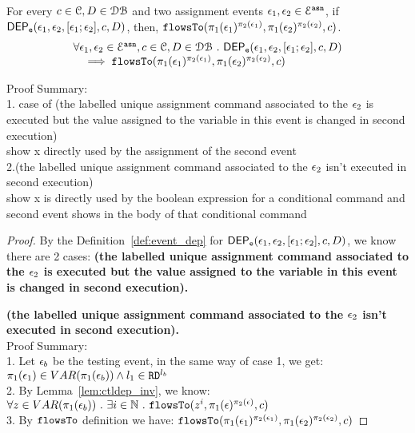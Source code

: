 \begin{lem}
	\label{lem:flowsto_soundness_emptytrace}
	For every $ c \in \mathcal{C}, D \in \mathcal{DB}$ and two assignment events $\mathtt{\epsilon}_1, \mathtt{\epsilon}_2 \in \mathcal{E}^{\mathtt{{asn}}}$,
	if $\mathsf{DEP_{\mathtt{e}}}(\mathtt{\epsilon}_1, \mathtt{\epsilon}_2, [\mathtt{\epsilon}_1; \mathtt{\epsilon}_2],  c, D) $,
	then, $\mathtt{flowsTo}(\pi_1(\mathtt{\epsilon}_1)^{\pi_2(\mathtt{\epsilon}_1)}, \pi_1(\mathtt{\epsilon}_2)^{\pi_2(\mathtt{\epsilon}_2)}, c)$.
	\[
	\begin{array}{l}
		\forall \mathtt{\epsilon}_1, \mathtt{\epsilon}_2 \in \mathcal{E}^{\mathtt{{asn}}}, c \in \mathcal{C}, D \in \mathcal{DB} 
		~.~ 
		\mathsf{DEP_{\mathtt{e}}}(\mathtt{\epsilon}_1, \mathtt{\epsilon}_2, [\mathtt{\epsilon}_1; \mathtt{\epsilon}_2],  c, D) 
		\\ \quad 
		\implies 
		\mathtt{flowsTo}(\pi_1(\mathtt{\epsilon}_1)^{\pi_2(\mathtt{\epsilon}_1)}, \pi_1(\mathtt{\epsilon}_2)^{\pi_2(\mathtt{\epsilon}_2)}, c)
	\end{array}
	\]
\end{lem}
Proof Summary:
\\
1. case of (the labelled unique assignment command associated to the $\mathtt{\epsilon}_2$ 
is executed but the value assigned to the variable in this event is changed in second execution)
\\
show x directly used by the assignment of the second event
\\
2.(the labelled unique assignment command associated to the $\mathtt{\epsilon}_2$ isn't executed in second execution)
\\
show x is directly used by the boolean expression for a conditional command and second event shows in the body of that conditional command 
%
\begin{proof}
	By the Definition~\ref{def:event_dep} for $\mathsf{DEP_{\mathtt{e}}}(\mathtt{\epsilon}_1, \mathtt{\epsilon}_2, [\mathtt{\epsilon}_1; \mathtt{\epsilon}_2], c, D)$, 
	we know there are 2 cases:
		\textbf{(the labelled unique assignment command associated to the $\mathtt{\epsilon}_2$ 
		is executed but the value assigned to the variable in this event is changed in second execution).}
	
		\textbf{(the labelled unique assignment command associated to the $\mathtt{\epsilon}_2$ isn't executed in second execution).}
		\\
		Proof Summary:
		\\
		1. Let $\mathtt{\epsilon}_b$ be the testing event,
		in the same way of case 1, we get:
		 $\pi_1(\mathtt{\epsilon}_1) \in VAR(\pi_1(\mathtt{\epsilon}_b)) 
		 \land 
		 l_1 \in \mathtt{RD}^{l_b}$
		 \\
		 2. By Lemma~\ref{lem:ctldep_inv}, we know:
		   $\forall z \in VAR(\pi_1(\mathtt{\epsilon}_b)) ~.~ \exists i \in \mathbb{N} ~.~
		 \mathtt{flowsTo}(z^i, \pi_1(\mathtt{\epsilon})^{\pi_2(\mathtt{\epsilon})}, c)$
		 \\
		 3. By $\mathtt{flowsTo}$ definition we have:
		   $\mathtt{flowsTo}(\pi_1(\mathtt{\epsilon}_1)^{\pi_2(\mathtt{\epsilon}_1)}, \pi_1(\mathtt{\epsilon}_2)^{\pi_2(\mathtt{\epsilon}_2)}, c)$
		
\end{proof}
